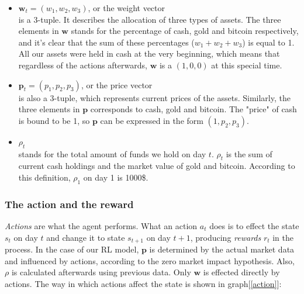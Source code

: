 \documentclass{mcmthesis}
\begin{document}
\begin{itemize}
  \item $\pmb{w}_t = (w_1, w_2, w_3)$, or the weight vector \\is a 3-tuple.
  It describes the allocation of three types of assets.
  The three elements in $\pmb{w}$ stands for the percentage of cash, gold and bitcoin respectively,
  and it's clear that the sum of these percentages ($w_1+w_2+w_3$) is equal to 1.\\
  All our assets were held in cash at the very beginning,
  which means that regardless of the actions afterwards,
  $\pmb{w}$ is a $(1,0,0)$ at this special time.

  \item $\pmb{p}_t = (p_1, p_2, p_3)$, or the price vector \\ is also a 3-tuple,
  which represents current prices of the assets.
  Similarly, the three elements in $\pmb{p}$ corresponds to cash, gold and bitcoin.
  The "price" of cash is bound to be 1,
  so $\pmb{p}$ can be expressed in the form $(1,p_2,p_3)$.

  \item $\rho _t$\\
  stands for the total amount of funds we hold on day $t$.
  $\rho _t$ is the sum of current cash holdings and the market value of gold and bitcoin.
  According to this definition, $\rho _1$ on day 1 is 1000\$.
\end{itemize}

\subsubsection{The action and the reward}

\textit{Actions} are what the agent performs.
What an action $a_t$ does is to effect the state $s_t$ on day $t$
and change it to state $s_{t+1}$ on day $t+1$,
producing \textit{rewards} $r_t$ in the process.
In the case of our RL model,
$\pmb{p}$ is determined by the actual market data and influenced by actions,
according to the zero market impact hypothesis.
Also, $\rho $ is calculated afterwards using previous data.
Only $\pmb{w}$ is effected directly by actions.
The way in which actions affect the state is shown in graph[\ref{action}]:
\end{document}
